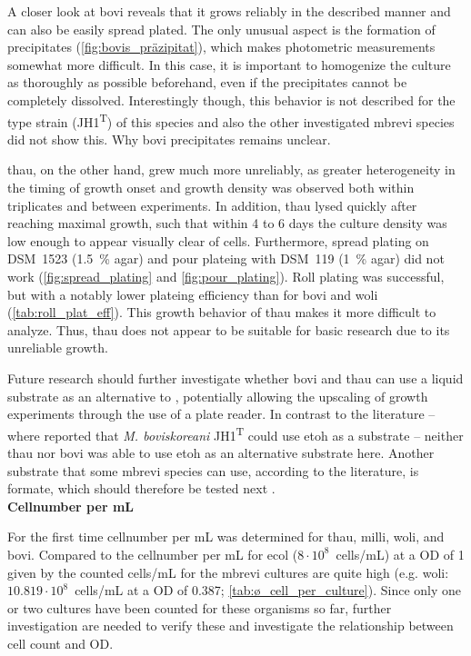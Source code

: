 A closer look at \acrshort{bovi} reveals that it grows reliably in the described manner and can also be easily spread plated. The only unusual aspect is the formation of precipitates (\cref{fig:bovis_präzipitat}), which makes photometric measurements somewhat more difficult. In this case, it is important to homogenize the culture as thoroughly as possible beforehand, even if the precipitates cannot be completely dissolved. Interestingly though, this behavior is not described for the type strain (JH1\textsuperscript{T}) of this species and also the other investigated \acrshort{mbrevi} species did not show this. Why \acrlong{bovi} precipitates remains unclear.  

\acrshort{thau}, on the other hand, grew much more unreliably, as greater heterogeneity in the timing of growth onset and growth density was observed both within triplicates and between experiments. In addition, \acrshort{thau} lysed quickly after reaching maximal growth, such that within 4 to 6 days the culture density was low enough to appear visually clear of cells. Furthermore, spread plating on DSM~1523 (1.5~\% agar) and pour \gls{plateing} with DSM~119 (1~\% agar) did not work (\cref{fig:spread_plating} and \cref{fig:pour_plating}). Roll plating was successful, but with a notably lower \gls{plateing} efficiency than for \acrshort{bovi} and \acrshort{woli} (\cref{tab:roll_plat_eff}).
This growth behavior of \acrshort{thau} makes it more difficult to analyze. Thus, \acrshort{thau} does not appear to be suitable for basic research due to its unreliable growth.

Future research should further investigate whether \acrshort{bovi} and \acrshort{thau} can use a liquid substrate as an alternative to , potentially allowing the upscaling of growth experiments through the use of a plate reader. In contrast to the literature -- where \textcite{liMethanobrevibacterBoviskoreaniJH1T2023} reported that \textit{M. boviskoreani} JH1\textsuperscript{T} could use \acrshort{etoh} as a substrate -- neither \acrshort{thau} nor \acrshort{bovi} was able to use \acrshort{etoh} as an alternative substrate here.
Another substrate that some \acrlong{mbrevi} species can use, according to the literature, is formate, which should therefore be tested next \parencite{liMethanobrevibacterBoviskoreaniJH1T2023, hoedtDifferencesDownunderAlcoholfueled2016}.\\

\textbf{Cellnumber per mL}

\noindent For the first time cellnumber per mL was determined for \acrshort{thau}, \acrshort{milli}, \acrshort{woli}, and \acrshort{bovi}. Compared to the cellnumber per mL for \acrshort{ecol} ($8 \cdot 10^8$~cells/mL) at a \acrshort{OD} of 1 given by \textcite{merckkgaaCellDensityMeasurement2026} the counted cells/mL for the \acrshort{mbrevi} cultures are quite high (e.g. \acrshort{woli}: $10.819 \cdot 10^8$~cells/mL at a \acrshort{OD} of 0.387; \cref{tab:ø_cell_per_culture}).  
Since only one or two cultures have been counted for these organisms so far, further investigation are needed to verify these and investigate the relationship between cell count and \acrshort{OD}.

